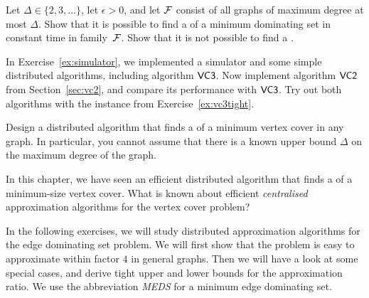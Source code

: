 \begin{ex}\label{ex:domset}
    Let $\Delta \in \{2,3,\dotsc\}$, let $\epsilon > 0$, and let $\mathcal{F}$ consist of all graphs of maximum degree at most $\Delta$. Show that it is possible to find a  of a minimum dominating set in constant time in family~$\mathcal{F}$. Show that it is not possible to find a .
    
\end{ex}

\begin{ex}[implementation]
    In Exercise~\ref{ex:simulator}, we implemented a simulator and some simple distributed algorithms, including algorithm $\textsf{VC3}$. Now implement algorithm $\textsf{VC2}$ from Section~\ref{sec:vc2}, and compare its performance with $\textsf{VC3}$. Try out both algorithms with the instance from Exercise~\ref{ex:vc3tight}.
\end{ex}

\begin{ex}
    Design a distributed algorithm that finds a  of a minimum vertex cover in any graph. In particular, you cannot assume that there is a known upper bound $\Delta$ on the maximum degree of the graph.

\end{ex}

\begin{ex}
    In this chapter, we have seen an efficient distributed algorithm that finds a  of a minimum-size vertex cover. What is known about efficient \emph{centralised} approximation algorithms for the vertex cover problem?
\end{ex}

\mysep

\noindent In the following exercises, we will study distributed approximation algorithms for the edge dominating set problem. We will first show that the problem is easy to approximate within factor $4$ in general graphs. Then we will have a look at some special cases, and derive tight upper and lower bounds for the approximation ratio. We use the abbreviation \emph{MEDS} for a minimum edge dominating set.

